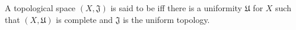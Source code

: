 A topological space $(X, \mathfrak{J})$ is said to be  iff there is a uniformity $\mathfrak{U}$ for $X$ such that $(X, \mathfrak{U})$ is complete and $\mathfrak{J}$ is the uniform topology.
